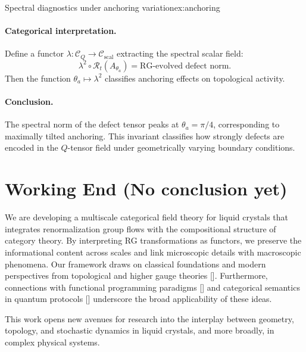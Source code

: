 \begin{example}{Spectral diagnostics under anchoring variation}{ex:anchoring}
		\paragraph{Categorical interpretation.}
		Define a functor \( \lambda: \mathcal{C}_Q \to \mathcal{C}_{\mathrm{scal}} \) extracting the spectral scalar field:
		\[
		\lambda^2 \circ \mathcal{R}_t (A_{\theta_a}) = \text{RG-evolved defect norm}.
		\]
		Then the function \( \theta_a \mapsto \lambda^2 \) classifies anchoring effects on topological activity.
		
		
		\paragraph{Conclusion.}
		The spectral norm of the defect tensor peaks at \( \theta_a = \pi/4 \), corresponding to maximally tilted anchoring. This invariant classifies how strongly defects are encoded in the \( Q \)-tensor field under geometrically varying boundary conditions.
		
	\end{example}
	



	
	

	
	
	\section{Working End (No conclusion yet)}
	
	We are developing a multiscale categorical field theory for liquid crystals that integrates renormalization group flows with the compositional structure of category theory. By interpreting RG transformations as functors, we preserve the informational content across scales and link microscopic details with macroscopic phenomena. Our framework draws on classical foundations \cite{maclane1971categories, degennes1993physics} and modern perspectives from topological and higher gauge theories [\cite{atiyah1988topological, segal2004definition, baez2007higher, freed1995chern}]. Furthermore, connections with functional programming paradigms [\cite{hudak1989conception}] and categorical semantics in quantum protocols [\cite{abramsky2004categorical, selinger2007dagger}] underscore the broad applicability of these ideas.
	
	This work opens new avenues for research into the interplay between geometry, topology, and stochastic dynamics in liquid crystals, and more broadly, in complex physical systems.
	
	\newpage
	
	
	

